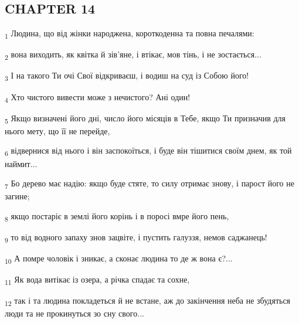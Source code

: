 \subsection{CHAPTER 14}
\begin{tcolorbox}
\textsubscript{1} Людина, що від жінки народжена, короткоденна та повна печалями:
\end{tcolorbox}
\begin{tcolorbox}
\textsubscript{2} вона виходить, як квітка й зів'яне, і втікає, мов тінь, і не зостається...
\end{tcolorbox}
\begin{tcolorbox}
\textsubscript{3} І на такого Ти очі Свої відкриваєш, і водиш на суд із Собою його!
\end{tcolorbox}
\begin{tcolorbox}
\textsubscript{4} Хто чистого вивести може з нечистого? Ані один!
\end{tcolorbox}
\begin{tcolorbox}
\textsubscript{5} Якщо визначені його дні, число його місяців в Тебе, якщо Ти призначив для нього мету, що її не перейде,
\end{tcolorbox}
\begin{tcolorbox}
\textsubscript{6} відвернися від нього і він заспокоїться, і буде він тішитися своїм днем, як той наймит...
\end{tcolorbox}
\begin{tcolorbox}
\textsubscript{7} Бо дерево має надію: якщо буде стяте, то силу отримає знову, і парост його не загине;
\end{tcolorbox}
\begin{tcolorbox}
\textsubscript{8} якщо постаріє в землі його корінь і в поросі вмре його пень,
\end{tcolorbox}
\begin{tcolorbox}
\textsubscript{9} то від водного запаху знов зацвіте, і пустить галуззя, немов саджанець!
\end{tcolorbox}
\begin{tcolorbox}
\textsubscript{10} А помре чоловік і зникає, а сконає людина то де ж вона є?...
\end{tcolorbox}
\begin{tcolorbox}
\textsubscript{11} Як вода витікає із озера, а річка спадає та сохне,
\end{tcolorbox}
\begin{tcolorbox}
\textsubscript{12} так і та людина покладеться й не встане, аж до закінчення неба не збудяться люди та не прокинуться зо сну свого...
\end{tcolorbox}
